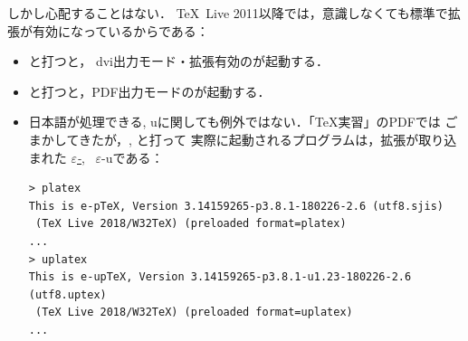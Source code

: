 \documentclass[b5paper]{bxjsarticle} %
\begin{document}
しかし心配することはない．
\TeX~Live 2011以降では，意識しなくても標準で\eTeX 拡張が有効になっているからである：
\begin{itemize}
\item {}と打つと，
  dvi出力モード・\eTeX 拡張有効の\pdfTeX が起動する．
\item {}と打つと，PDF出力モードの\pdfTeX が起動する．
\item 日本語が処理できる\pTeX, u\pTeX に関しても例外ではない．「\TeX 実習」のPDFでは
ごまかしてきたが，, と打って
実際に起動されるプログラムは，\eTeX 拡張が取り込まれた
\href{https://ja.osdn.net/projects/eptex/wiki/FrontPage}{\emph{$\varepsilon$-\pTeX}},~%
$\varepsilon$-u\pTeX である：
\begin{lstlisting}
> platex
This is e-pTeX, Version 3.14159265-p3.8.1-180226-2.6 (utf8.sjis)
 (TeX Live 2018/W32TeX) (preloaded format=platex)
...
> uplatex
This is e-upTeX, Version 3.14159265-p3.8.1-u1.23-180226-2.6 (utf8.uptex)
 (TeX Live 2018/W32TeX) (preloaded format=uplatex)
...
\end{lstlisting}
\end{itemize}




\newpage
\section{\pdfTeX}
\label{sec:pdftex}
\end{document}
